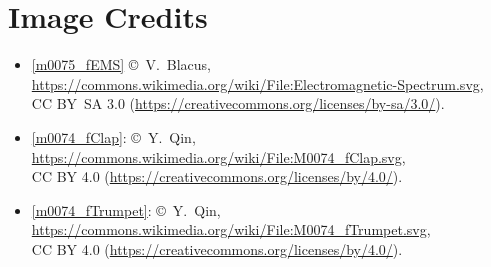 

\label{m0026_Ch_End_Matter_Preliminary_Concepts} %

\onecolumn
\section*{Image Credits}

\begin{itemize}

\item[Fig.] \label{m0075_fEMS_Credit}
  \ref{m0075_fEMS}
  \copyright~V.\ Blacus, 
  \url{https://commons.wikimedia.org/wiki/File:Electromagnetic-Spectrum.svg},\\ 
  CC BY~SA 3.0 (\url{https://creativecommons.org/licenses/by-sa/3.0/}).

\item[Fig.] \label{m0074_fClap_Credit}
  \ref{m0074_fClap}:
  \copyright~Y.\ Qin, 
  \url{https://commons.wikimedia.org/wiki/File:M0074_fClap.svg},\\ 
  CC BY 4.0 (\url{https://creativecommons.org/licenses/by/4.0/}).

\item[Fig.] \label{m0074_fTrumpet_Credit}
  \ref{m0074_fTrumpet}:
  \copyright~Y.\ Qin, 
  \url{https://commons.wikimedia.org/wiki/File:M0074_fTrumpet.svg},\\ 
  CC BY 4.0 (\url{https://creativecommons.org/licenses/by/4.0/}).

\end{itemize}

\twocolumn
